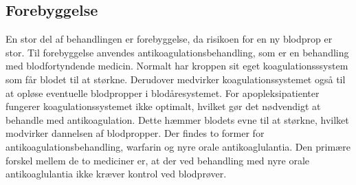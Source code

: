 \subsection{Forebyggelse}
En stor del af behandlingen er forebyggelse, da risikoen for en ny blodprop er stor. Til forebyggelse anvendes antikoagulationsbehandling, som er en behandling med blodfortyndende medicin. Normalt har kroppen sit eget koagulationsssystem som får blodet til at størkne. Derudover medvirker koagulationssystemet også til at opløse eventuelle blodpropper i blodåresystemet. For apopleksipatienter fungerer koagulationssystemet ikke optimalt, hvilket gør det nødvendigt at behandle med antikoagulation. Dette hæmmer blodets evne til at størkne, hvilket modvirker dannelsen af blodpropper. Der findes to former for antikoagulationsbehandling, warfarin og nyre orale antikoaglulantia. Den primære forskel mellem de to mediciner er, at der ved behandling med nyre orale antikoaglulantia ikke kræver kontrol ved blodprøver.\cite{Kjaergaard2015}

